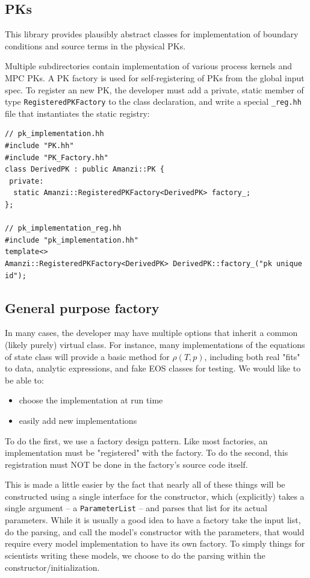 \subsection{PKs}
This library provides plausibly abstract classes for implementation of 
boundary conditions and source terms in the physical PKs.

Multiple subdirectories contain implementation of various process kernels and MPC PKs.
A PK factory is used for self-registering of PKs from the global input spec.
To register an new PK, the developer must add a private, static member of type 
{\tt RegisteredPKFactory} to the class declaration, and write a special {\tt \_reg.hh} 
file that instantiates the static registry:

\begin{lstlisting}
// pk_implementation.hh
#include "PK.hh"
#include "PK_Factory.hh"
class DerivedPK : public Amanzi::PK {
 private:
  static Amanzi::RegisteredPKFactory<DerivedPK> factory_;
};

// pk_implementation_reg.hh
#include "pk_implementation.hh"
template<>
Amanzi::RegisteredPKFactory<DerivedPK> DerivedPK::factory_("pk unique id");
\end{lstlisting}


\clearpage
\subsection{General purpose factory}
In many cases, the developer may have multiple options that inherit a
common (likely purely) virtual class.  
For instance, many implementations of the equations of state class will 
provide a basic method for $\rho(T,p)$,  including both real "fits" to 
data, analytic expressions, and fake EOS classes for testing. 
We would like to be able to:
\begin{itemize}
\item choose the implementation at run time
\item easily add new implementations
\end{itemize}

To do the first, we use a factory design pattern. 
Like most factories, an implementation must be "registered" with the factory.  
To do the second, this registration must NOT be done in the factory's source code itself.

This is made a little easier by the fact that nearly all of these things
will be constructed using a single interface for the constructor, which
(explicitly) takes a single argument -- a {\tt ParameterList} -- and
parses that list for its actual parameters.  While it is usually a good
idea to have a factory take the input list, do the parsing, and call the
model's constructor with the parameters, that would require every model
implementation to have its own factory.  To simply things for scientists
writing these models, we choose to do the parsing within the
constructor/initialization.

